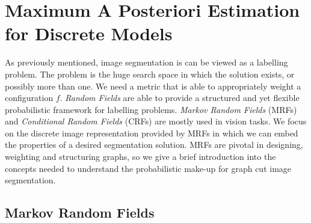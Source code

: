 
\section{Maximum A Posteriori Estimation for Discrete Models}
\label{sec:MAPEstimates}

As previously mentioned, image segmentation is can be viewed as a labelling problem.
The problem is the huge search space in which the solution exists, or possibly more than one.
We need a metric that is able to appropriately weight a configuration $f$.
\textit{Random Fields} are able to provide a structured and yet flexible probabilistic framework for labelling problems.
\textit{Markov Random Fields} (MRFs) and \textit{Conditional Random Fields} (CRFs) are mostly used in vision tasks.
We focus on the discrete image representation provided by MRFs in which we can embed the properties of a desired segmentation solution.
MRFs are pivotal in designing, weighting and structuring graphs, so we give a brief introduction into the concepts needed to understand the probabilistic make-up for graph cut image segmentation.


\subsection{Markov Random Fields}
\label{sec:MarkovRandomFields}

